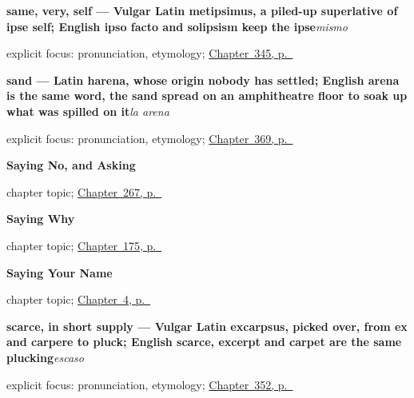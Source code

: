 \noindent\begin{minipage}[t]{\linewidth}
\raggedright
\textbf{same, very, self — Vulgar Latin metipsimus, a piled-up superlative of ipse self; English ipso facto and solipsism keep the ipse}\enspace\emph{mismo}\par
\footnotesize explicit focus: pronunciation, etymology; \hyperref[ch:cada-y-mismo]{Chapter~345, p.~\pageref*{ch:cada-y-mismo}}
\end{minipage}\par\smallskip

\noindent\begin{minipage}[t]{\linewidth}
\raggedright
\textbf{sand — Latin harena, whose origin nobody has settled; English arena is the same word, the sand spread on an amphitheatre floor to soak up what was spilled on it}\enspace\emph{la arena}\par
\footnotesize explicit focus: pronunciation, etymology; \hyperref[ch:el-rio-y-la-arena]{Chapter~369, p.~\pageref*{ch:el-rio-y-la-arena}}
\end{minipage}\par\smallskip

\noindent\begin{minipage}[t]{\linewidth}
\raggedright
\textbf{Saying No, and Asking}\par
\footnotesize chapter topic; \hyperref[ch:es-negate-and-ask]{Chapter~267, p.~\pageref*{ch:es-negate-and-ask}}
\end{minipage}\par\smallskip

\noindent\begin{minipage}[t]{\linewidth}
\raggedright
\textbf{Saying Why}\par
\footnotesize chapter topic; \hyperref[ch:spanish-giving-reasons]{Chapter~175, p.~\pageref*{ch:spanish-giving-reasons}}
\end{minipage}\par\smallskip

\noindent\begin{minipage}[t]{\linewidth}
\raggedright
\textbf{Saying Your Name}\par
\footnotesize chapter topic; \hyperref[ch:your-name]{Chapter~4, p.~\pageref*{ch:your-name}}
\end{minipage}\par\smallskip

\noindent\begin{minipage}[t]{\linewidth}
\raggedright
\textbf{scarce, in short supply — Vulgar Latin excarpsus, picked over, from ex and carpere to pluck; English scarce, excerpt and carpet are the same plucking}\enspace\emph{escaso}\par
\footnotesize explicit focus: pronunciation, etymology; \hyperref[ch:el-conjunto-y-el-resto]{Chapter~352, p.~\pageref*{ch:el-conjunto-y-el-resto}}
\end{minipage}\par\smallskip

